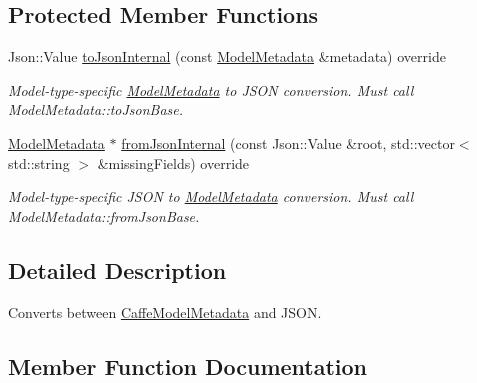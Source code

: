 \subsection*{Protected Member Functions}
\begin{DoxyCompactItemize}
\item 
Json\+::\+Value \hyperlink{classdg_1_1deepcore_1_1classification_1_1_caffe_model_metadata_json_ab32a3ef2b1d3345b0c1bfedc12b04e87}{to\+Json\+Internal} (const \hyperlink{classdg_1_1deepcore_1_1classification_1_1_model_metadata}{Model\+Metadata} \&metadata) override
\begin{DoxyCompactList}\small\item\em Model-\/type-\/specific \hyperlink{classdg_1_1deepcore_1_1classification_1_1_model_metadata}{Model\+Metadata} to J\+S\+ON conversion. Must call Model\+Metadata\+::to\+Json\+Base. \end{DoxyCompactList}\item 
\hyperlink{classdg_1_1deepcore_1_1classification_1_1_model_metadata}{Model\+Metadata} $\ast$ \hyperlink{classdg_1_1deepcore_1_1classification_1_1_caffe_model_metadata_json_a1070ed25d3b4c95c83fab0896000fd44}{from\+Json\+Internal} (const Json\+::\+Value \&root, std\+::vector$<$ std\+::string $>$ \&missing\+Fields) override
\begin{DoxyCompactList}\small\item\em Model-\/type-\/specific J\+S\+ON to \hyperlink{classdg_1_1deepcore_1_1classification_1_1_model_metadata}{Model\+Metadata} conversion. Must call Model\+Metadata\+::from\+Json\+Base. \end{DoxyCompactList}\end{DoxyCompactItemize}


\subsection{Detailed Description}
Converts between \hyperlink{structdg_1_1deepcore_1_1classification_1_1_caffe_model_metadata}{Caffe\+Model\+Metadata} and J\+S\+ON. 

\subsection{Member Function Documentation}
